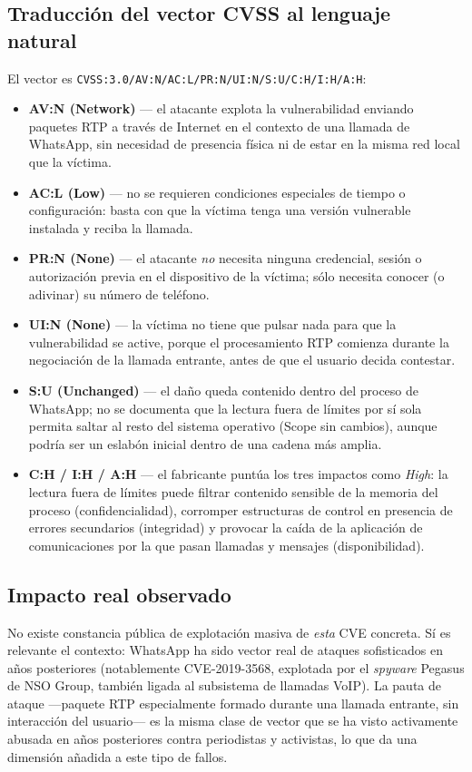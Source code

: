 \subsection*{Traducción del vector CVSS al lenguaje natural}

El vector es \texttt{CVSS:3.0/AV:N/AC:L/PR:N/UI:N/S:U/C:H/I:H/A:H}:

\begin{itemize}[leftmargin=*]
    \item \textbf{AV:N (Network)} --- el atacante explota la vulnerabilidad enviando paquetes RTP a través de Internet en el contexto de una llamada de WhatsApp, sin necesidad de presencia física ni de estar en la misma red local que la víctima.
    \item \textbf{AC:L (Low)} --- no se requieren condiciones especiales de tiempo o configuración: basta con que la víctima tenga una versión vulnerable instalada y reciba la llamada.
    \item \textbf{PR:N (None)} --- el atacante \textit{no} necesita ninguna credencial, sesión o autorización previa en el dispositivo de la víctima; sólo necesita conocer (o adivinar) su número de teléfono.
    \item \textbf{UI:N (None)} --- la víctima no tiene que pulsar nada para que la vulnerabilidad se active, porque el procesamiento RTP comienza durante la negociación de la llamada entrante, antes de que el usuario decida contestar.
    \item \textbf{S:U (Unchanged)} --- el daño queda contenido dentro del proceso de WhatsApp; no se documenta que la lectura fuera de límites por sí sola permita saltar al resto del sistema operativo (Scope sin cambios), aunque podría ser un eslabón inicial dentro de una cadena más amplia.
    \item \textbf{C:H / I:H / A:H} --- el fabricante puntúa los tres impactos como \textit{High}: la lectura fuera de límites puede filtrar contenido sensible de la memoria del proceso (confidencialidad), corromper estructuras de control en presencia de errores secundarios (integridad) y provocar la caída de la aplicación de comunicaciones por la que pasan llamadas y mensajes (disponibilidad).
\end{itemize}

\subsection*{Impacto real observado}

No existe constancia pública de explotación masiva de \textit{esta} CVE concreta. Sí es relevante el contexto: WhatsApp ha sido vector real de ataques sofisticados en años posteriores (notablemente CVE-2019-3568, explotada por el \textit{spyware} Pegasus de NSO Group, también ligada al subsistema de llamadas VoIP). La pauta de ataque ---paquete RTP especialmente formado durante una llamada entrante, sin interacción del usuario--- es la misma clase de vector que se ha visto activamente abusada en años posteriores contra periodistas y activistas, lo que da una dimensión añadida a este tipo de fallos.

